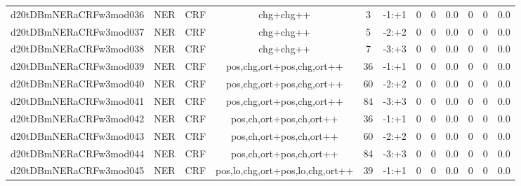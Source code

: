 \documentclass[a4paper]{article}
\begin{document}
\begin{landscape}
\begin{center}
\begin{tabular}{ |c|c|c|c|c|c|c|c|c|c|c|c|}
 
 	
 	\small{ d20tDBmNERaCRFw3mod036 } & \small{ NER} & \small{  CRF }  & chg+chg++  &  3 &  \small{  -1:+1 }  &  0 & 0 & 0.0  &  0 & 0 & 0.0 \\
 	

 
 	
 	\small{ d20tDBmNERaCRFw3mod037 } & \small{ NER} & \small{  CRF }  & chg+chg++  &  5 &  \small{  -2:+2 }  &  0 & 0 & 0.0  &  0 & 0 & 0.0 \\
 	

 
 	
 	\small{ d20tDBmNERaCRFw3mod038 } & \small{ NER} & \small{  CRF }  & chg+chg++  &  7 &  \small{  -3:+3 }  &  0 & 0 & 0.0  &  0 & 0 & 0.0 \\
 	

 
 	
 	\small{ d20tDBmNERaCRFw3mod039 } & \small{ NER} & \small{  CRF }  & pos,chg,ort+pos,chg,ort++  &  36 &  \small{  -1:+1 }  &  0 & 0 & 0.0  &  0 & 0 & 0.0 \\
 	

 
 	
 	\small{ d20tDBmNERaCRFw3mod040 } & \small{ NER} & \small{  CRF }  & pos,chg,ort+pos,chg,ort++  &  60 &  \small{  -2:+2 }  &  0 & 0 & 0.0  &  0 & 0 & 0.0 \\
 	

 
 	
 	\small{ d20tDBmNERaCRFw3mod041 } & \small{ NER} & \small{  CRF }  & pos,chg,ort+pos,chg,ort++  &  84 &  \small{  -3:+3 }  &  0 & 0 & 0.0  &  0 & 0 & 0.0 \\
 	

 
 	
 	\small{ d20tDBmNERaCRFw3mod042 } & \small{ NER} & \small{  CRF }  & pos,ch,ort+pos,ch,ort++  &  36 &  \small{  -1:+1 }  &  0 & 0 & 0.0  &  0 & 0 & 0.0 \\
 	

 
 	
 	\small{ d20tDBmNERaCRFw3mod043 } & \small{ NER} & \small{  CRF }  & pos,ch,ort+pos,ch,ort++  &  60 &  \small{  -2:+2 }  &  0 & 0 & 0.0  &  0 & 0 & 0.0 \\
 	

 
 	
 	\small{ d20tDBmNERaCRFw3mod044 } & \small{ NER} & \small{  CRF }  & pos,ch,ort+pos,ch,ort++  &  84 &  \small{  -3:+3 }  &  0 & 0 & 0.0  &  0 & 0 & 0.0 \\
 	

 
 	
 	\small{ d20tDBmNERaCRFw3mod045 } & \small{ NER} & \small{  CRF }  & pos,lo,chg,ort+pos,lo,chg,ort++  &  39 &  \small{  -1:+1 }  &  0 & 0 & 0.0  &  0 & 0 & 0.0 \\
 	

\end{tabular}
\end{center}
\end{landscape}
\end{document}
